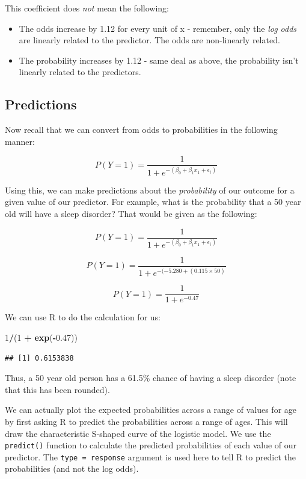 \documentclass[
]{book}
\newenvironment{Shaded}{\begin{snugshade}}{\end{snugshade}}
\newcommand{\DecValTok}[1]{\textcolor[rgb]{0.00,0.00,0.81}{#1}}
\newcommand{\FloatTok}[1]{\textcolor[rgb]{0.00,0.00,0.81}{#1}}
\newcommand{\FunctionTok}[1]{\textcolor[rgb]{0.13,0.29,0.53}{\textbf{#1}}}
\newcommand{\NormalTok}[1]{#1}
\newcommand{\SpecialCharTok}[1]{\textcolor[rgb]{0.81,0.36,0.00}{\textbf{#1}}}
\providecommand{\tightlist}{%
  \setlength{\itemsep}{0pt}\setlength{\parskip}{0pt}}
\begin{document}
This coefficient does \emph{not} mean the following:

\begin{itemize}
\tightlist
\item
  The odds increase by 1.12 for every unit of x - remember, only the \emph{log odds} are linearly related to the predictor. The odds are non-linearly related.
\item
  The probability increases by 1.12 - same deal as above, the probability isn't linearly related to the predictors.
\end{itemize}

\subsection{Predictions}\label{predictions-1}

Now recall that we can convert from odds to probabilities in the following manner:

\[
P(Y = 1) = \frac{1}{1 + e^{-(\beta_0 + \beta_1 x_1 + \epsilon_i)}} 
\]

Using this, we can make predictions about the \emph{probability} of our outcome for a given value of our predictor. For example, what is the probability that a 50 year old will have a sleep disorder? That would be given as the following:

\[
P(Y = 1) = \frac{1}{1 + e^{-(\beta_0 + \beta_1 x_1 + \epsilon_i)}} 
\]

\[
P(Y = 1) = \frac{1}{1 + e^{-(-5.280 + (0.115 \times 50)}} 
\]

\[
P(Y = 1) = \frac{1}{1 + e^{-0.47}} 
\]

We can use R to do the calculation for us:

\begin{Shaded}
\begin{Highlighting}[]
\DecValTok{1}\SpecialCharTok{/}\NormalTok{(}\DecValTok{1} \SpecialCharTok{+} \FunctionTok{exp}\NormalTok{(}\SpecialCharTok{{-}}\FloatTok{0.47}\NormalTok{))}
\end{Highlighting}
\end{Shaded}

\begin{verbatim}
## [1] 0.6153838
\end{verbatim}

Thus, a 50 year old person has a 61.5\% chance of having a sleep disorder (note that this has been rounded).

We can actually plot the expected probabilities across a range of values for age by first asking R to predict the probabilities across a range of ages. This will draw the characteristic S-shaped curve of the logistic model. We use the \texttt{predict()} function to calculate the predicted probabilities of each value of our predictor. The \texttt{type\ =\ response} argument is used here to tell R to predict the probabilities (and not the log odds).
\end{document}
